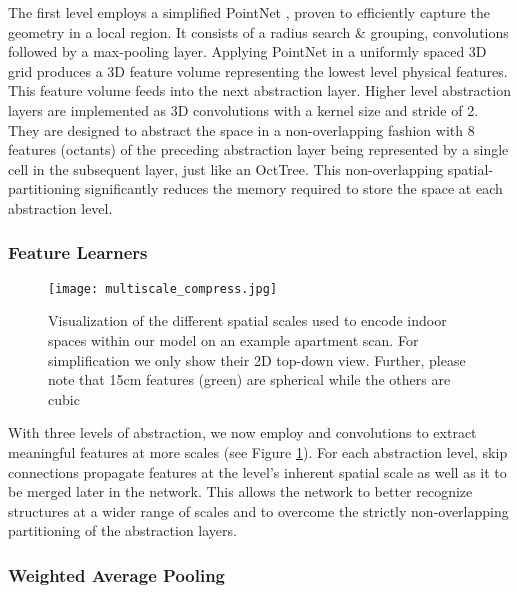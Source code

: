 \documentclass[runningheads]{llncs}
\begin{document}
The first level employs a simplified PointNet \cite{Qi2017_2}, proven to efficiently capture the geometry in a local region. It consists of a radius search \& grouping,  convolutions followed by a max-pooling layer. Applying PointNet in a uniformly spaced 3D grid produces a 3D feature volume representing the lowest level physical features. This feature volume feeds into the next abstraction layer. Higher level abstraction layers are implemented as 3D convolutions with a kernel size and stride of 2. They are designed to abstract the space in a non-overlapping fashion with 8 features (octants) of the preceding abstraction layer being represented by a single cell in the subsequent layer, just like an OctTree. This non-overlapping spatial-partitioning significantly reduces the memory required to store the space at each abstraction level.

\subsubsection{Feature Learners}

\begin{figure}[t]
    \centering
 \texttt{[image: multiscale\_compress.jpg]}
    \caption{Visualization of the different spatial scales used to encode indoor spaces within our model on an example apartment scan. For simplification we only show their 2D top-down view. Further, please note that 15cm features (green) are spherical while the others are cubic}
    \label{fig:multiscale}  
\end{figure}

With three levels of abstraction, we now employ  and  convolutions to extract meaningful features at more scales (see Figure \ref{fig:multiscale}). For each abstraction level, skip connections propagate features at the level's inherent spatial scale as well as  it to be merged later in the network. This allows the network to better recognize structures at a wider range of scales and to overcome the strictly non-overlapping partitioning of the abstraction layers. 

\subsubsection{Weighted Average Pooling}
\end{document}
